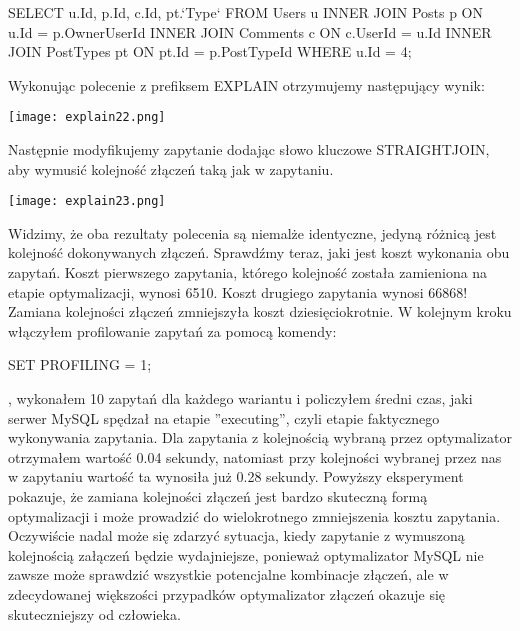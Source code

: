 \begin{spverbatim}
	SELECT u.Id, p.Id, c.Id, pt.`Type` FROM Users u INNER JOIN Posts p ON u.Id = p.OwnerUserId	INNER JOIN Comments c ON c.UserId = u.Id INNER JOIN PostTypes pt ON pt.Id = p.PostTypeId WHERE u.Id = 4;
\end{spverbatim}

Wykonując polecenie z prefiksem EXPLAIN otrzymujemy następujący wynik:
\begin{center}
	\texttt{[image: explain22.png]} 
\end{center}
Następnie modyfikujemy zapytanie dodając słowo kluczowe STRAIGHT\textunderscore JOIN, aby wymusić kolejność złączeń taką jak w zapytaniu.
\begin{center}
	\texttt{[image: explain23.png]} 
\end{center}
Widzimy, że oba rezultaty polecenia są niemalże identyczne, jedyną różnicą jest kolejność dokonywanych złączeń. Sprawdźmy teraz, jaki jest koszt wykonania obu zapytań. Koszt pierwszego zapytania, którego kolejność została zamieniona na etapie optymalizacji, wynosi 6510. Koszt drugiego zapytania wynosi 66868! Zamiana kolejności złączeń zmniejszyła koszt dziesięciokrotnie.
W kolejnym kroku włączyłem profilowanie zapytań za pomocą komendy:
\begin{spverbatim}
	SET PROFILING = 1;
\end{spverbatim}, wykonałem 10 zapytań dla każdego wariantu i policzyłem średni czas, jaki serwer MySQL spędzał na etapie ''executing'', czyli etapie faktycznego wykonywania zapytania. Dla zapytania z kolejnością wybraną przez optymalizator otrzymałem wartość 0.04 sekundy, natomiast przy kolejności wybranej przez nas w zapytaniu wartość ta wynosiła już 0.28 sekundy. Powyższy eksperyment pokazuje, że zamiana kolejności złączeń jest bardzo skuteczną formą optymalizacji i może prowadzić do wielokrotnego zmniejszenia kosztu zapytania. Oczywiście nadal może się zdarzyć sytuacja, kiedy zapytanie z wymuszoną kolejnością załączeń będzie wydajniejsze, ponieważ optymalizator MySQL nie zawsze może sprawdzić wszystkie potencjalne kombinacje złączeń, ale w zdecydowanej większości przypadków optymalizator złączeń okazuje się skuteczniejszy od człowieka.

